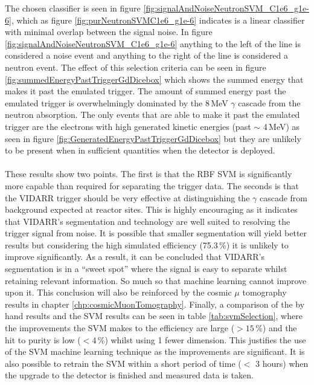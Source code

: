 The chosen classifier is seen in figure \ref{fig:signalAndNoiseNeutronSVM_C1e6_g1e-6}, which as figure \ref{fig:purNeutronSVMC1e6_g1e-6} indicates is a linear classifier with minimal overlap between the signal noise. In figure \ref{fig:signalAndNoiseNeutronSVM_C1e6_g1e-6} anything to the left of the line is considered a noise event and anything to the right of the line is considered a neutron event. The effect of this selection criteria can be seen in figure \ref{fig:summedEnergyPastTriggerGdDicebox} which shows the summed energy that makes it past the emulated trigger. The amount of summed energy past the emulated trigger is overwhelmingly dominated by the 8\,MeV $\gamma$ cascade from the neutron absorption. The only events that are able to make it past the emulated trigger are the electrons with high generated kinetic energies (past $\sim$ 4\,MeV) as seen in figure \ref{fig:GeneratedEnergyPastTriggerGdDicebox} but they are unlikely to be present when in sufficient quantities when the detector is deployed. 
\\\\These results show two points. The first is that the RBF SVM is significantly more capable than required for separating the trigger data. The seconds is that the VIDARR trigger should be very effective at distinguishing the $\gamma$ cascade from background expected at reactor sites. This is highly encouraging as it indicates that VIDARR's segmentation and technology are well suited to resolving the trigger signal from noise. It is possible that smaller segmentation will yield better results but considering the high simulated efficiency (75.3\,\%) it is unlikely to improve significantly. As a result, it can be concluded that VIDARR's segmentation is in a ``sweet spot'' where the signal is easy to separate whilst retaining relevant information. So much so that machine learning cannot improve upon it. This conclusion will also be reinforced by the cosmic $\mu$ tomography results in chapter \ref{chp:cosmicMuonTomography}. Finally, a comparison of the by hand results and the SVM results can be seen in table \ref{tab:svmSelection}, where the improvements the SVM makes to the efficiency are large ($> 15\,\%$) and the hit to purity is low ($< 4\,\%$) whilst using 1 fewer dimension. This justifies the use of the SVM machine learning technique as the improvements are significant. It is also possible to retrain the SVM within a short period of time ($<$ 3 hours) when the upgrade to the detector is finished and measured data is taken.  

